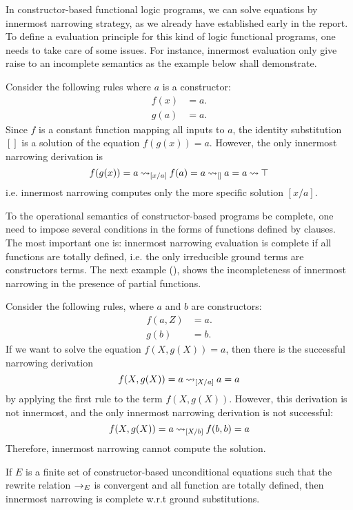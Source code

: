 In constructor-based functional logic programs, we can solve equations by innermost narrowing strategy, as we already have established early in the report. To define a evaluation principle for this kind of logic functional programs, one needs to take care of some issues. For instance, innermost evaluation only give raise to an incomplete semantics as the example below shall demonstrate.
\begin{example}
    Consider the following rules where $a$ is a constructor:
    \begin{align*}
        f(x) &= a. \\
        g(a) &= a.
    \end{align*}
    Since $f$ is a constant function mapping all inputs to $a$, the identity substitution $[]$ is a solution of the equation $f(g(x)) = a$. However, the only innermost narrowing derivation is
    $$f(g(x)) = a \mathbin{\rightsquigarrow}_{[x/a]} f(a) = a \mathbin{\rightsquigarrow}_{[]} a = a \mathbin{\rightsquigarrow} \top$$
    i.e. innermost narrowing computes only the more specific solution $[x / a]$.
\end{example}

To the operational semantics of constructor-based programs be complete, one need to impose several conditions in the forms of functions defined by clauses. The most important one is: innermost narrowing evaluation is complete if all functions are totally defined, i.e. the only irreducible ground terms are constructors terms. The next example (\cite{HANUS1994583}), shows the incompleteness of innermost narrowing in the presence of partial functions.

\begin{example}
    Consider the following rules, where $a$ and $b$ are constructors:
    \begin{align*}
        f(a, Z) &= a. \\
        g(b) &= b.
    \end{align*}
    If we want to solve the equation $f(X, g(X)) = a$, then there is the successful narrowing derivation
    $$f(X, g(X)) = a \mathbin{\rightsquigarrow}_{[X / a]} a = a$$
    by applying the first rule to the term $f(X, g(X))$. However, this derivation is not innermost, and the only innermost narrowing derivation is not successful:
    $$f(X,g(X)) = a \mathbin{\rightsquigarrow}_{[X/b]} f(b,b) = a$$
    Therefore, innermost narrowing cannot compute the solution.
\end{example}

\begin{theorem}
    If $E$ is a finite set of constructor-based unconditional equations such that the rewrite relation $\rightarrow_E$ is convergent and all function are totally defined, then innermost narrowing is complete w.r.t ground substitutions.
\end{theorem}


